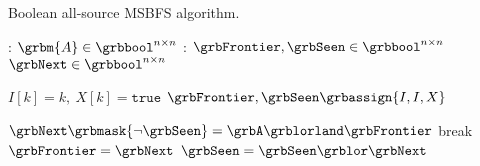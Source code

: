 \begin{algorithm}[htb]
	\footnotesize
	\caption{Boolean all-source MSBFS algorithm.}
	\label{alg:GraphBLAS:MSBFS:bool}
	\begin{algorithmic}[1]
		\Input: $\grbm{A} \in \grbbool^{n \times n}$
		\EndInput
		\Data:
			\State $\grbFrontier, \grbSeen \in \grbbool^{n \times n}$ 
			\State $\grbNext     \in \grbbool^{n \times n}$ 
		\EndData

		 
			\State $I[k] = k, \ X[k] = \mathtt{true}$ 
		\EndFor
		\State $\grbFrontier, \grbSeen \grbassign \{ I, I, X \}$

			\State $\grbNext\grbmask{\neg\grbSeen} = \grbA \grblorland \grbFrontier$ %
			 break \EndIf
			\State $\grbFrontier = \grbNext$
			\State $\grbSeen = \grbSeen \grblor \grbNext$
		\EndFor
		\EndProcedure
		\end{algorithmic}
\end{algorithm}
